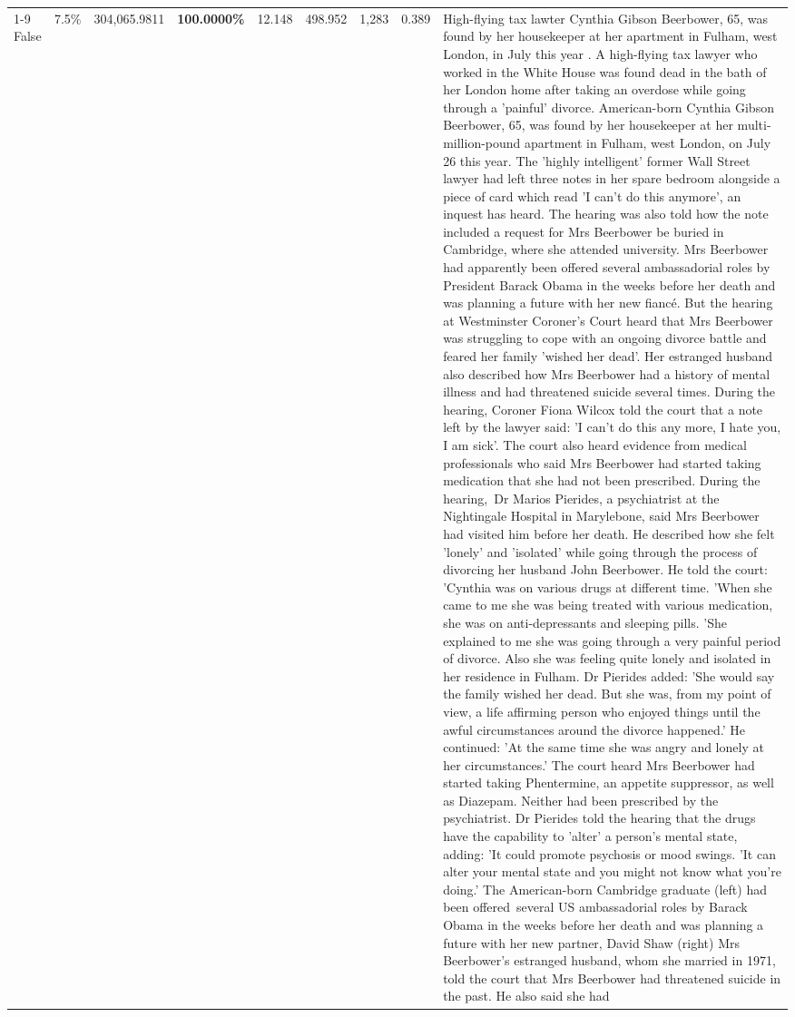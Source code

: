 \begin{table}[H]
\begin{tabular}{lllrlllll}
\cline{1-9}
False & 7.5\% & \color{red} 304,065.9811 & \bfseries \color{red} 100.0000\% & 12.148 & 498.952 & 1,283 & 0.389 & High-flying tax lawter Cynthia Gibson Beerbower, 65, was found by her housekeeper at her apartment in Fulham, west London, in July this year . A high-flying tax lawyer who worked in the White House was found dead in the bath of her London home after taking an overdose while going through a 'painful' divorce. American-born Cynthia Gibson Beerbower, 65, was found by her housekeeper at her multi-million-pound apartment in Fulham, west London, on July 26 this year. The 'highly intelligent' former Wall Street lawyer had left three notes in her spare bedroom alongside a piece of card which read 'I can't do this anymore', an inquest has heard. The hearing was also told how the note included a request for Mrs Beerbower be buried in Cambridge, where she attended university. Mrs Beerbower had apparently been offered several ambassadorial roles by President Barack Obama in the weeks before her death and was planning a future with her new fiancé. But the hearing at Westminster Coroner's Court heard that Mrs Beerbower was struggling to cope with an ongoing divorce battle and feared her family 'wished her dead'. Her estranged husband also described how Mrs Beerbower had a history of mental illness and had threatened suicide several times. During the hearing, Coroner Fiona Wilcox told the court that a note left by the lawyer said: 'I can't do this any more, I hate you, I am sick'. The court also heard evidence from medical professionals who said Mrs Beerbower had started taking medication that she had not been prescribed. During the hearing, Dr Marios Pierides, a psychiatrist at the Nightingale Hospital in Marylebone, said Mrs Beerbower had visited him before her death. He described how she felt 'lonely' and 'isolated' while going through the process of divorcing her husband John Beerbower. He told the court: 'Cynthia was on various drugs at different time. 'When she came to me she was being treated with various medication, she was on anti-depressants and sleeping pills. 'She explained to me she was going through a very painful period of divorce. Also she was feeling quite lonely and isolated in her residence in Fulham. Dr Pierides added: 'She would say the family wished her dead. But she was, from my point of view, a life affirming person who enjoyed things until the awful circumstances around the divorce happened.' He continued: 'At the same time she was angry and lonely at her circumstances.' The court heard Mrs Beerbower had started taking Phentermine, an appetite suppressor, as well as Diazepam. Neither had been prescribed by the psychiatrist. Dr Pierides told the hearing that the drugs have the capability to 'alter' a person's mental state, adding: 'It could promote psychosis or mood swings. 'It can alter your mental state and you might not know what you're doing.' The American-born Cambridge graduate (left) had been offered several US ambassadorial roles by Barack Obama in the weeks before her death and was planning a future with her new partner, David Shaw (right) Mrs Beerbower's estranged husband, whom she married in 1971, told the court that Mrs Beerbower had threatened suicide in the past. He also said she had 
\end{tabular}
\end{table}
